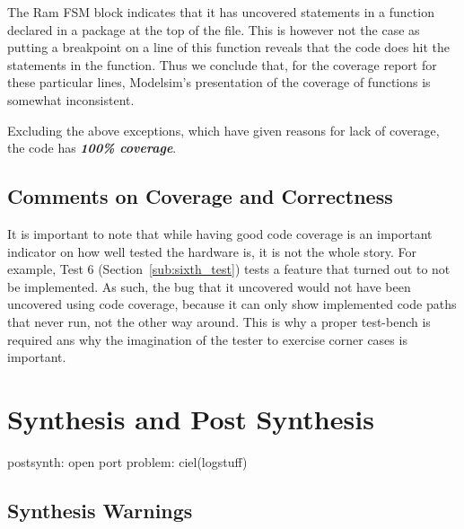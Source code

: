 \documentclass[]{article}
\begin{document}
The Ram FSM block indicates that it has uncovered statements in a function declared in a package at the top of the file. This is however not the case as putting a breakpoint on a line of this function reveals that the code does hit the statements in the function. Thus we conclude that, for the coverage report for these particular lines, Modelsim's presentation of the coverage of functions is somewhat inconsistent.

Excluding the above exceptions, which have given reasons for lack of coverage, the code has \emph{\textbf{100\% coverage}}.

\subsection{Comments on Coverage and Correctness} %
\label{sub:comments_on_coverage_and_correctness}

It is important to note that while having good code coverage is an important indicator on how well tested the hardware is, it is not the whole story. For example, Test 6 (Section~\ref{sub:sixth_test}) tests a feature that turned out to not be implemented.
As such, the bug that it uncovered would not have been uncovered using code coverage, because it can only show implemented code paths that never run, not the other way around. This is why a proper test-bench is required ans why the imagination of the tester to exercise corner cases is important.



\section{Synthesis and Post Synthesis} %
\label{sec:synthesis_and_post_synthesis}

postsynth: open port problem: ciel(logstuff)

\subsection{Synthesis Warnings} %
\label{sub:synthesis_warnings}
\end{document}
